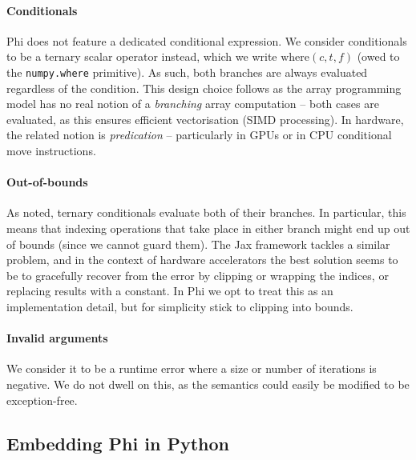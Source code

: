 \paragraph{Conditionals} Phi does not feature a dedicated conditional expression. We consider conditionals to be a ternary scalar operator instead, which we write $\mathrm{where}(c, t, f)$ (owed to the \texttt{numpy.where} primitive). As such, both branches are always evaluated regardless of the condition. This design choice follows as the array programming model has no real notion of a \textit{branching} array computation -- both cases are evaluated, as this ensures efficient vectorisation (SIMD processing). In hardware, the related notion is \textit{predication} -- particularly in GPUs or in CPU conditional move instructions.

\paragraph{Out-of-bounds} As noted, ternary conditionals evaluate both of their branches. In particular, this means that indexing operations that take place in either branch might end up out of bounds (since we cannot guard them). 
The Jax framework tackles a similar problem, and in the context of hardware accelerators the best solution seems to be to gracefully recover from the error by clipping or wrapping the indices, or replacing results with a constant. 
In Phi we opt to treat this as an implementation detail, but for simplicity stick to clipping into bounds.

\paragraph{Invalid arguments} We consider it to be a runtime error where a size or number of iterations is negative. We do not dwell on this, as the semantics could easily be modified to be exception-free.

\subsection{Embedding Phi in Python}

